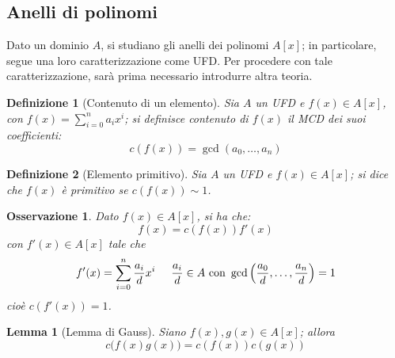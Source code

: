 \documentclass[12pt]{scrartcl}
\theoremstyle{style}
\newtheorem{definizione}{Definizione}[section]
\newtheorem{lemma}{Lemma}[teorema]
\newtheorem{osservazione}{Osservazione}[section]
\numberwithin{equation}{subsection}
\begin{document}
\subsection{Anelli di polinomi}
Dato un dominio $A$, si studiano gli anelli dei polinomi $A[x]$; in particolare, segue una loro caratterizzazione come UFD.
Per procedere con tale caratterizzazione, sar\`a prima necessario introdurre altra teoria.
\begin{definizione}
	[Contenuto di un elemento]
	Sia $A$ un UFD e $f(x) \in A[x]$, con $f(x) = \sum_{i=0}^{n} a_ix^i$; si definisce \textit{contenuto} di $f(x)$ il MCD dei suoi coefficienti:
	\[
	c(f(x))=\operatorname{gcd}(a_0,\ldots,a_n) 
	\] 
\end{definizione}
\begin{definizione}
	[Elemento primitivo]
	Sia $A$ un UFD e $f(x) \in A[x]$; si dice che $f(x)$ \`e \textit{primitivo} se $c(f(x)) \sim 1$.
\end{definizione}
\begin{osservazione}
	Dato $f(x) \in A[x]$, si ha che:
	\[
	f(x) = c(f(x)) f'(x)
	\] 
	con $f'(x) \in A[x]$ tale che 
\[
f'(x) = \sum_{i=0}^{n} \frac{a_i}{d}x^i \hspace{.5cm} \frac{a_i}{d} \in A \text{ con } \operatorname{gcd}\left(\frac{a_0}{d},\ldots, \frac{a_n}{d}\right) = 1
\] 
	cio\`e $c(f'(x)) = 1$.
\end{osservazione}
\begin{lemma}
	[Lemma di Gauss]
	Siano $f(x), g(x) \in A[x]$; allora
	\[
		c\big(f(x)g(x)\big) = c(f(x)) c(g(x))
	\] 
\end{lemma}
\end{document}
